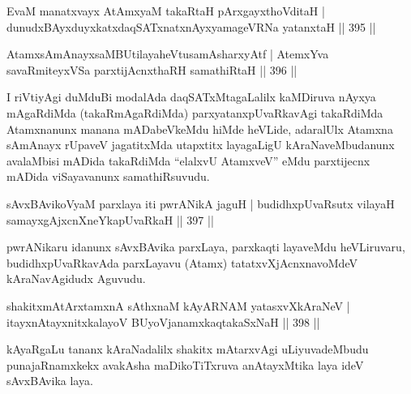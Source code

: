 
\begin{shl}
EvaM manatxvayx AtAmx\s yaM takaRtaH pArxgayxthoVditaH |
dunudxBAyxduyxkatxdaqSATxnatxnAyxyamageVRNa yatanxtaH \hfill || 395 ||
\end{shl}
\begin{shl}
AtamxsAmAnayxsaMBUtilayaheVtusamAsharxyAtf |
AtemxYva savaRmiteyxVSa parxtijAcnxthaRH samathiRtaH \hfill || 396 ||
\end{shl}

\begin{artha}
I riVtiyAgi duMduBi modalAda daqSATxMtagaLalilx kaMDiruva nAyxya mAgaRdiMda (takaRmAgaRdiMda) parxyatanxpUvaRkavAgi takaRdiMda Atamxnanunx manana mADabeVkeMdu hiMde heVLide, adaralUlx Atamxna sAmAnayx rUpaveV jagatitxMda utapxtitx layagaLigU kAraNaveMbudanunx avalaMbisi mADida takaRdiMda ``elalxvU AtamxveV'' eMdu parxtijecnx mADida viSayavanunx samathiRsuvudu.
\end{artha}

\begin{shl}
sAvxBAvikoV\s yaM parxlaya iti \footnotemark[1]pwrANikA jaguH |
budidhxpUvaRsutx vilayaH samayxgAjxcnXneYkapUvaRkaH \hfill || 397 ||
\end{shl}


\begin{artha}
pwrANikaru idanunx sAvxBAvika parxLaya, parxkaqti layaveMdu heVLiruvaru, budidhxpUvaRkavAda parxLayavu (Atamx) tatatxvXjAcnxnavoMdeV kAraNavAgidudx Aguvudu.
\end{artha}


\begin{shl}
shakitxmAtArxtamxnA sAthxnaM kAyARNAM yatasxvXkAraNeV |
itayxnAtayxnitxkalayoV BUyoVjanamxkaqtakaSxNaH \hfill || 398 ||
\end{shl}

\begin{artha}
kAyaRgaLu tananx kAraNadalilx shakitx mAtarxvAgi uLiyuvadeMbudu punajaRnamxkekx avakAsha maDikoTiTxruva anAtayxMtika laya ideV sAvxBAvika laya.
\end{artha}

